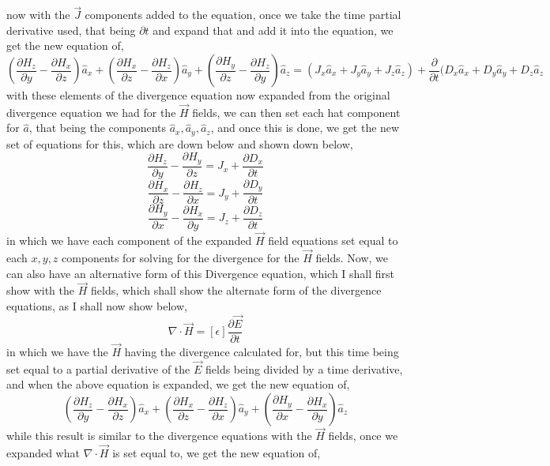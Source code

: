 \documentclass[]{article}
\begin{document}
now with the $\vec{J}$ components added to the equation, once we take the time partial derivative used, that being $\partial{t}$ and expand that and add it into the equation, we get the new equation of,
\begin{equation}
(\frac{\partial{H}_z}{\partial{y}} - \frac{\partial{H}_x}{\partial{z}})\hat{a}_x + (\frac{\partial{H}_x}{\partial{z}} - \frac{\partial{H}_z}{\partial{x}})\hat{a}_y + (\frac{\partial{H}_y}{\partial{z}} - \frac{\partial{H}_z}{\partial{y}})\hat{a}_z = (J_x\hat{a}_x + J_y\hat{a}_y + J_z\hat{a}_z) + \frac{\partial}{\partial{t}}(D_x\hat{a}_x+D_y\hat{a}_y+D_z\hat{a}_z
\end{equation}
with these elements of the divergence equation now expanded from the original divergence equation we had for the $\vec{H}$ fields, we can then set each hat component for $\hat{a}$, that being the components $\hat{a}_x,\hat{a}_y,\hat{a}_z$, and once this is done, we get the new set of equations for this, which are down below and shown down below,
\[\frac{\partial{H}_z}{\partial{y}} - \frac{\partial{H}_y}{\partial{z}} = J_x + \frac{\partial{D}_x}{\partial{t}} \] 
\[\frac{\partial{H}_x}{\partial{z}} - \frac{\partial{H}_z}{\partial{x}} = J_y + \frac{\partial{D}_y}{\partial{t}} \]
\[\frac{\partial{H}_y}{\partial{x}} - \frac{\partial{H}_x}{\partial{y}} = J_z + \frac{\partial{D}_z}{\partial{t}} \]
in which we have each component of the expanded $\vec{H}$ field equations set equal to each $x,y,z$ components for solving for the divergence for the $\vec{H}$ fields. Now, we can also have an alternative form of this Divergence equation, which I shall first show with the $\vec{H}$ fields, which shall show the alternate form of the divergence equations, as I shall now show below,
\begin{equation}
\nabla \cdot \vec{H} = [\epsilon] \frac{\partial{\vec{E}}}{\partial{t}}
\end{equation}
in which we have the $\vec{H}$ having the divergence calculated for, but this time being set equal to a partial derivative of the $\vec{E}$ fields being divided by a time derivative, and when the above equation is expanded, we get the new equation of,
\begin{equation}
(\frac{\partial{H}_z}{\partial{y}} - \frac{\partial{H}_x}{\partial{z}})\hat{a}_x + (\frac{\partial{H}_x}{\partial{z}} - \frac{\partial{H}_z}{\partial{x}})\hat{a}_y + (\frac{\partial{H}_y}{\partial{x}} - \frac{\partial{H}_x}{\partial{y}})\hat{a}_z
\end{equation}
while this result is similar to the divergence equations with the $\vec{H}$ fields, once we expanded what $\nabla \cdot \vec{H}$ is set equal to, we get the new equation of,
\end{document}
